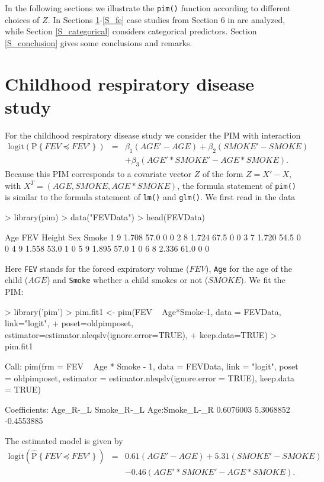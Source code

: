 \documentclass[12pt]{article}
\newcommand{\prob}[1]{\text{P}\left\{#1\right\}}
\newcommand{\hatprob}[1]{\hat{\text{P}}\left\{#1\right\}}
\newcommand{\leqs}{\preccurlyeq}
\begin{document}
In the following sections we illustrate the \texttt{pim()} function according to different choices of $Z$. In Sections \ref{S_crds}-\ref{S_fe} case studies from Section 6 in \cite{Thas2012} are analyzed, while Section \ref{S_categorical} considers categorical predictors. Section \ref{S_conclusion} gives some conclusions and remarks.  




\section{Childhood respiratory disease study}\label{S_crds}

For the childhood respiratory disease study we consider the PIM with interaction
\begin{eqnarray*}
\text{logit} \left( \prob{FEV \leqs FEV' } \right) &=& \beta_1 (AGE' - AGE) + \beta_2(SMOKE' - SMOKE) \\ 
												   & &  + \beta_3 (AGE'*SMOKE' - AGE*SMOKE). 
\end{eqnarray*}
Because this PIM corresponds to a covariate vector $Z$ of the form $Z = X' -X$, with $X^T = (AGE, SMOKE, AGE*SMOKE)$, the formula statement of \texttt{pim()} is similar to the formula statement of \texttt{lm()} and \texttt{glm()}. We first read in the data
\begin{Schunk}
\begin{Sinput}
> library(pim)
> data("FEVData")
> head(FEVData)
\end{Sinput}
\begin{Soutput}
  Age   FEV Height Sex Smoke
1   9 1.708   57.0   0     0
2   8 1.724   67.5   0     0
3   7 1.720   54.5   0     0
4   9 1.558   53.0   1     0
5   9 1.895   57.0   1     0
6   8 2.336   61.0   0     0
\end{Soutput}
\end{Schunk}
Here \verb|FEV| stands for the forced expiratory volume ($FEV$), \verb|Age| for the age of the child ($AGE$) and \verb|Smoke| whether a child smokes or not ($SMOKE$). We fit the PIM:
\begin{Schunk}
\begin{Sinput}
> library('pim')
> pim.fit1 <- pim(FEV ~ Age*Smoke-1, data = FEVData, link="logit", 
+ 								poset=oldpimposet, estimator=estimator.nleqslv(ignore.error=TRUE), 
+ 								keep.data=TRUE)
> pim.fit1
\end{Sinput}
\begin{Soutput}
Call:
pim(frm = FEV ~ Age * Smoke - 1, data = FEVData, link = "logit", 
    poset = oldpimposet, estimator = estimator.nleqslv(ignore.error = TRUE), 
    keep.data = TRUE)

Coefficients:
      Age_R-_L     Smoke_R-_L Age:Smoke_L-_R 
     0.6076003      5.3068852     -0.4553885 
\end{Soutput}
\end{Schunk}
The estimated model is given by
\begin{eqnarray*}
\text{logit} \left( \hatprob{FEV \leqs FEV' } \right) &=& 0.61 (AGE' - AGE) + 5.31(SMOKE' - SMOKE) \\ 
												   & &   -0.46 (AGE'*SMOKE' - AGE*SMOKE). 
\end{eqnarray*}
\end{document}

